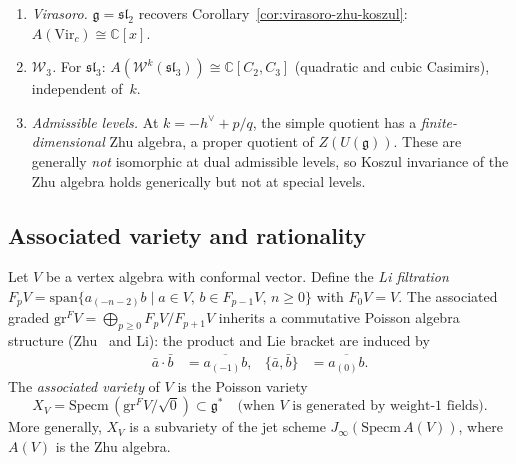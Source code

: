 \begin{remark}\label{rem:zhu-w-algebras-explicit}
\leavevmode
\begin{enumerate}[label=(\roman*)]
\item \emph{Virasoro.}  $\mathfrak{g} = \mathfrak{sl}_2$ recovers Corollary~\ref{cor:virasoro-zhu-koszul}: $A(\mathrm{Vir}_c) \cong \mathbb{C}[x]$.
\item \emph{$\mathcal{W}_3$.}  For $\mathfrak{sl}_3$: $A(\mathcal{W}^k(\mathfrak{sl}_3)) \cong \mathbb{C}[C_2, C_3]$ (quadratic and cubic Casimirs), independent of~$k$.
\item \emph{Admissible levels.}  At $k = -h^\vee + p/q$, the simple quotient has a \emph{finite-dimensional} Zhu algebra, a proper quotient of $Z(U(\mathfrak{g}))$.  These are generally \emph{not} isomorphic at dual admissible levels, so Koszul invariance of the Zhu algebra holds generically but not at special levels.
\end{enumerate}
\end{remark}

\subsection{Associated variety and rationality}

\begin{definition}
\label{def:associated-variety}
Let $V$ be a vertex algebra with conformal vector.  Define the
\emph{Li filtration} $F_p V = \mathrm{span}\{a_{(-n-2)} b \mid
a \in V,\, b \in F_{p-1} V,\, n \geq 0\}$ with $F_0 V = V$.
The associated graded $\mathrm{gr}^F V = \bigoplus_{p \geq 0}
F_p V / F_{p+1} V$ inherits a commutative Poisson algebra structure
(Zhu~\cite{Zhu} and Li): the product and Lie bracket are induced by
\begin{align}
\bar{a} \cdot \bar{b} &= \overline{a_{(-1)} b}, &
\{\bar{a}, \bar{b}\} &= \overline{a_{(0)} b}.
\end{align}
The \emph{associated variety} of $V$ is the Poisson variety
\[
X_V = \mathrm{Specm}\,(\mathrm{gr}^F V / \sqrt{0}) \subset
\mathfrak{g}^* \quad
\text{(when $V$ is generated by weight-$1$ fields)}.
\]
More generally, $X_V$ is a subvariety of the jet scheme
$J_\infty(\mathrm{Specm}\, A(V))$, where $A(V)$ is the Zhu algebra.
\end{definition}

